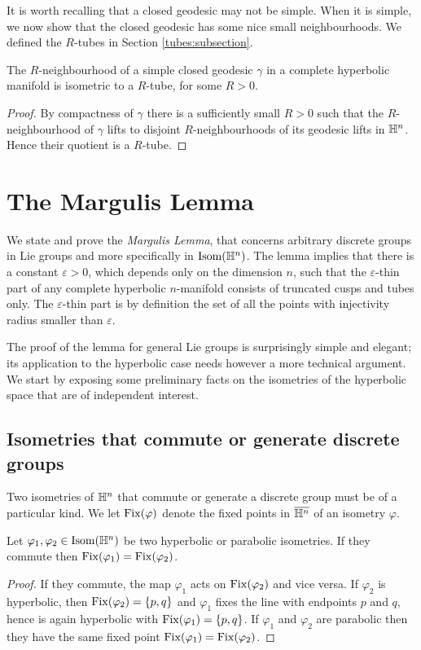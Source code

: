 It is worth recalling that a closed geodesic may not be simple. When it is simple, we now show that the closed geodesic has some nice small neighbourhoods. We defined the $R$-tubes in Section \ref{tubes:subsection}.

\begin{prop} \label{tube:prop}
The $R$-neighbourhood of a simple closed geodesic $\gamma$ in a complete hyperbolic manifold is isometric to a $R$-tube, for some $R>0$.
\end{prop}
\begin{proof}
By compactness of $\gamma$ there is a sufficiently small $R>0$ such that the $R$-neighbourhood of $\gamma$ lifts to disjoint $R$-neighbourhoods of its geodesic lifts in $\mathbb{H}^n$. Hence their quotient is a $R$-tube.
\end{proof}


\section{The Margulis Lemma}
We state and prove the \emph{Margulis Lemma}, that concerns arbitrary discrete groups in Lie groups and more specifically in ${\rm Isom}(\mathbb{H}^n)$. The lemma implies that there is a constant $\varepsilon>0$, which depends only on the dimension $n$, such that the $\varepsilon$-thin part of any complete hyperbolic $n$-manifold consists of truncated cusps and tubes only. The $\varepsilon$-thin part is by definition the set of all the points with injectivity radius smaller than $\varepsilon$.

The proof of the lemma for general Lie groups is surprisingly simple and elegant; its application to the hyperbolic case needs however a more technical argument. We start by exposing some preliminary facts on the isometries of the hyperbolic space that are of independent interest.

\subsection{Isometries that commute or generate discrete groups} \label{that:commute:subsection}
Two isometries of $\mathbb{H}^n$ that commute or generate a discrete group must be of a particular kind. We let ${\rm Fix}(\varphi)$ denote the fixed points in $\overline{\mathbb{H}^n}$ of an isometry $\varphi$. 

\begin{lemma} \label{commute:lemma}
Let $\varphi_1,\varphi_2\in{\rm Isom}(\mathbb{H}^n)$ be two hyperbolic or parabolic isometries. If they commute then ${\rm Fix}(\varphi_1) = {\rm Fix}(\varphi_2)$.
\end{lemma}
\begin{proof}
If they commute, the map $\varphi_1$ acts on ${\rm Fix}(\varphi_2)$ and vice versa. If $\varphi_2$ is hyperbolic, then ${\rm Fix}(\varphi_2)=\{p,q\}$ and $\varphi_1$ fixes the line with endpoints $p$ and $q$, hence is again hyperbolic with ${\rm Fix}(\varphi_1)=\{p,q\}$. If $\varphi_1$ and $\varphi_2$ are parabolic then they have the same fixed point ${\rm Fix}(\varphi_1) = {\rm Fix}(\varphi_2)$.
\end{proof}

